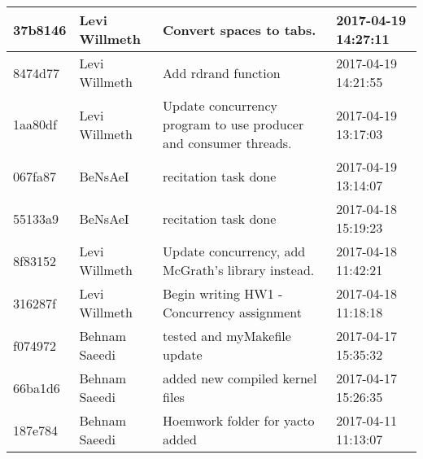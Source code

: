\documentclass[journal,10pt,onecolumn,compsoc,letterpaper,draftclsnofoot,table,xcdraw]{IEEEtran} \usepackage[margin=0.75in]{geometry}
\begin{document}
\begin{table}
\begin{tabular}{|
>{\columncolor[HTML]{BBDAFF}}l |l|l|l|}
37b8146                                             & Levi Willmeth                                         & Convert spaces to tabs.                                          & 2017-04-19 14:27:11                                    \\ \hline
8474d77                                             & Levi Willmeth                                         & Add rdrand function                                              & 2017-04-19 14:21:55                                    \\ \hline
1aa80df                                             & Levi Willmeth                                         & Update concurrency program to use producer and consumer threads. & 2017-04-19 13:17:03                                    \\ \hline
067fa87                                             & BeNsAeI                                               & recitation task done                                             & 2017-04-19 13:14:07                                    \\ \hline
55133a9                                             & BeNsAeI                                               & recitation task done                                             & 2017-04-18 15:19:23                                    \\ \hline
8f83152                                             & Levi Willmeth                                         & Update concurrency, add McGrath's library instead.               & 2017-04-18 11:42:21                                    \\ \hline
316287f                                             & Levi Willmeth                                         & Begin writing HW1 - Concurrency assignment                       & 2017-04-18 11:18:18                                    \\ \hline
f074972                                             & Behnam Saeedi                                         & tested and myMakefile update                                     & 2017-04-17 15:35:32                                    \\ \hline
66ba1d6                                             & Behnam Saeedi                                         & added new compiled kernel files                                  & 2017-04-17 15:26:35                                    \\ \hline
187e784                                             & Behnam Saeedi                                         & Hoemwork folder for yacto added                                  & 2017-04-11 11:13:07                                    \\ \hline

\end{tabular}
\end{table}
\end{document}
